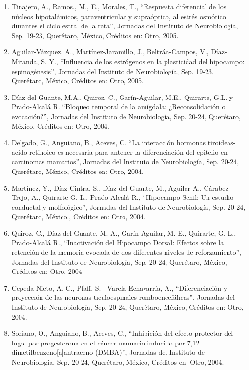 \documentclass[12pt]{article}
\begin{document}
\begin{enumerate}
\item Tinajero, A., Ramos., M., E., Morales, T., “Respuesta diferencial de los núcleos hipotalámicos, paraventricular y supraóptico, al 
estrés osmótico durantes el ciclo estral de la rata”, Jornadas del Instituto de Neurobiología, Sep. 19-23, Querétaro, México, Créditos 
en: Otro, 2005.

\item Aguilar-Vázquez, A., Martínez-Jaramillo, J., Beltrán-Campos, V., Díaz-Miranda, S. Y., “Influencia de los estrógenos en la 
plasticidad del hipocampo: espinogénesis”, Jornadas del Instituto de Neurobiología, Sep. 19-23, Querétaro, México, Créditos en: Otro, 
2005.

\item Díaz del Guante, M.A., Quiroz, C., Garín-Aguilar, M.E., Quirarte, G.L. y Prado-Alcalá R. “Bloqueo temporal de la amígdala: 
¿Reconsolidación o evocación?”, Jornadas del Instituto de Neurobiología, Sep. 20-24, Querétaro, México, Créditos en: Otro, 2004.

\item Delgado, G., Anguiano, B., Aceves, C. “La interacción hormonas tiroideas-acido retinoico es necesaria para antener la 
diferenciación del epitelio en carcinomas mamarios”, Jornadas del Instituto de Neurobiología, Sep. 20-24, Querétaro, México, Créditos 
en: Otro, 2004.

\item Martínez, Y., Díaz-Cintra, S., Díaz del Guante, M., Aguilar A., Cárabez-Trejo, A., Quirarte G. L., Prado-Alcalá R., “Hipocampo 
Senil: Un estudio conductal y molfológico”, Jornadas del Instituto de Neurobiología, Sep. 20-24, Querétaro, México., Créditos en: Otro, 
2004.

\item Quiroz, C., Díaz del Guante, M. A., Garín-Aguilar, M. E., Quirarte, G. L., Prado-Alcalá R., “Inactivación del Hipocampo Dorsal: 
Efectos sobre la retención de la memoria evocada de dos diferentes niveles de reforzamiento”, Jornadas del Instituto de Neurobiología, 
Sep. 20-24, Querétaro, México, Créditos en: Otro, 2004.

\item Cepeda Nieto, A. C., Pfaff, S. , Varela-Echavarría, A., “Diferenciación y proyección de las neuronas ticuloespinales 
romboencefálicas”, Jornadas del Instituto de Neurobiología, Sep. 20-24, Querétaro, México, Créditos en: Otro, 2004.

\item Soriano, O., Anguiano, B., Aceves, C., “Inhibición del efecto protector del lugol por progesterona en el cáncer mamario inducido 
por 7,12-dimetilbenzeno[a]antraceno (DMBA)”, Jornadas del Instituto de Neurobiología, Sep. 20-24, Querétaro, México, Créditos en: Otro, 
2004.


\end{enumerate}
\end{document}
